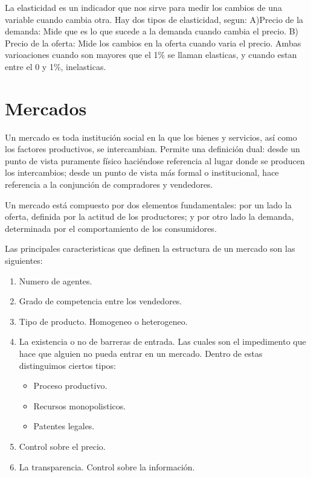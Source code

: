 \documentclass[
]{krantz}
\providecommand{\tightlist}{%
  \setlength{\itemsep}{0pt}\setlength{\parskip}{0pt}}
\begin{document}
La elasticidad es un indicador que nos sirve para medir los cambios de una variable cuando cambia otra. Hay dos tipos de elasticidad, segun: A)Precio de la demanda: Mide que es lo que sucede a la demanda cuando cambia el precio. B) Precio de la oferta: Mide los cambios en la oferta cuando varia el precio. Ambas varioaciones cuando son mayores que el 1\% se llaman elasticas, y cuando estan entre el 0 y 1\%, inelasticas.

\hypertarget{mercados}{%
\chapter{Mercados}\label{mercados}}

Un mercado es toda institución social en la que los bienes y servicios, así como los factores productivos, se intercambian. Permite una definición dual: desde un punto de vista puramente físico haciéndose referencia al lugar donde se producen los intercambios; desde un punto de vista más formal o institucional, hace referencia a la conjunción de compradores y vendedores.

Un mercado está compuesto por dos elementos fundamentales: por un lado la oferta, definida por la actitud de los productores; y por otro lado la demanda, determinada por el comportamiento de los consumidores.

Las principales caracteristicas que definen la estructura de un mercado son las siguientes:

\begin{enumerate}
\def\labelenumi{\arabic{enumi}.}
\tightlist
\item
  Numero de agentes.
\item
  Grado de competencia entre los vendedores.
\item
  Tipo de producto. Homogeneo o heterogeneo.
\item
  La existencia o no de barreras de entrada. Las cuales son el impedimento que hace que alguien no pueda entrar en un mercado. Dentro de estas distinguimos ciertos tipos:

  \begin{itemize}
  \tightlist
  \item
    Proceso productivo.
  \item
    Recursos monopolisticos.
  \item
    Patentes legales.
  \end{itemize}
\item
  Control sobre el precio.
\item
  La transparencia. Control sobre la información.
\end{enumerate}
\end{document}
